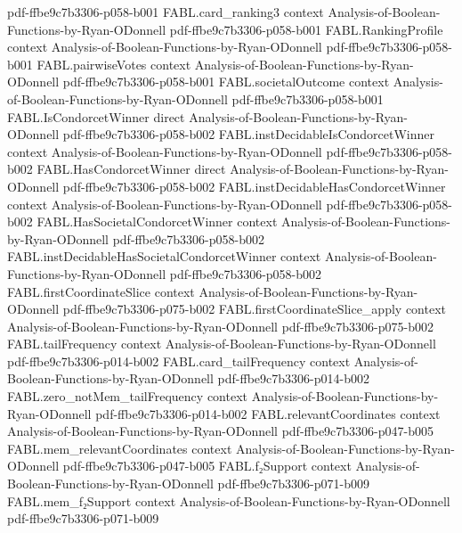 \begin{theorem}
  {pdf-ffbe9c7b3306-p058-b001}
\proofstep
  {FABL.card_ranking3}
  {context}
  {Analysis-of-Boolean-Functions-by-Ryan-ODonnell}
  {pdf-ffbe9c7b3306-p058-b001}
\proofstep
  {FABL.RankingProfile}
  {context}
  {Analysis-of-Boolean-Functions-by-Ryan-ODonnell}
  {pdf-ffbe9c7b3306-p058-b001}
\proofstep
  {FABL.pairwiseVotes}
  {context}
  {Analysis-of-Boolean-Functions-by-Ryan-ODonnell}
  {pdf-ffbe9c7b3306-p058-b001}
\proofstep
  {FABL.societalOutcome}
  {context}
  {Analysis-of-Boolean-Functions-by-Ryan-ODonnell}
  {pdf-ffbe9c7b3306-p058-b001}
\proofstep
  {FABL.IsCondorcetWinner}
  {direct}
  {Analysis-of-Boolean-Functions-by-Ryan-ODonnell}
  {pdf-ffbe9c7b3306-p058-b002}
\proofstep
  {FABL.instDecidableIsCondorcetWinner}
  {context}
  {Analysis-of-Boolean-Functions-by-Ryan-ODonnell}
  {pdf-ffbe9c7b3306-p058-b002}
\proofstep
  {FABL.HasCondorcetWinner}
  {direct}
  {Analysis-of-Boolean-Functions-by-Ryan-ODonnell}
  {pdf-ffbe9c7b3306-p058-b002}
\proofstep
  {FABL.instDecidableHasCondorcetWinner}
  {context}
  {Analysis-of-Boolean-Functions-by-Ryan-ODonnell}
  {pdf-ffbe9c7b3306-p058-b002}
\proofstep
  {FABL.HasSocietalCondorcetWinner}
  {context}
  {Analysis-of-Boolean-Functions-by-Ryan-ODonnell}
  {pdf-ffbe9c7b3306-p058-b002}
\proofstep
  {FABL.instDecidableHasSocietalCondorcetWinner}
  {context}
  {Analysis-of-Boolean-Functions-by-Ryan-ODonnell}
  {pdf-ffbe9c7b3306-p058-b002}
\proofstep
  {FABL.firstCoordinateSlice}
  {context}
  {Analysis-of-Boolean-Functions-by-Ryan-ODonnell}
  {pdf-ffbe9c7b3306-p075-b002}
\proofstep
  {FABL.firstCoordinateSlice_apply}
  {context}
  {Analysis-of-Boolean-Functions-by-Ryan-ODonnell}
  {pdf-ffbe9c7b3306-p075-b002}
\proofstep
  {FABL.tailFrequency}
  {context}
  {Analysis-of-Boolean-Functions-by-Ryan-ODonnell}
  {pdf-ffbe9c7b3306-p014-b002}
\proofstep
  {FABL.card_tailFrequency}
  {context}
  {Analysis-of-Boolean-Functions-by-Ryan-ODonnell}
  {pdf-ffbe9c7b3306-p014-b002}
\proofstep
  {FABL.zero_notMem_tailFrequency}
  {context}
  {Analysis-of-Boolean-Functions-by-Ryan-ODonnell}
  {pdf-ffbe9c7b3306-p014-b002}
\proofstep
  {FABL.relevantCoordinates}
  {context}
  {Analysis-of-Boolean-Functions-by-Ryan-ODonnell}
  {pdf-ffbe9c7b3306-p047-b005}
\proofstep
  {FABL.mem_relevantCoordinates}
  {context}
  {Analysis-of-Boolean-Functions-by-Ryan-ODonnell}
  {pdf-ffbe9c7b3306-p047-b005}
\proofstep
  {FABL.f₂Support}
  {context}
  {Analysis-of-Boolean-Functions-by-Ryan-ODonnell}
  {pdf-ffbe9c7b3306-p071-b009}
\proofstep
  {FABL.mem_f₂Support}
  {context}
  {Analysis-of-Boolean-Functions-by-Ryan-ODonnell}
  {pdf-ffbe9c7b3306-p071-b009}
\proofstep

\end{theorem}
